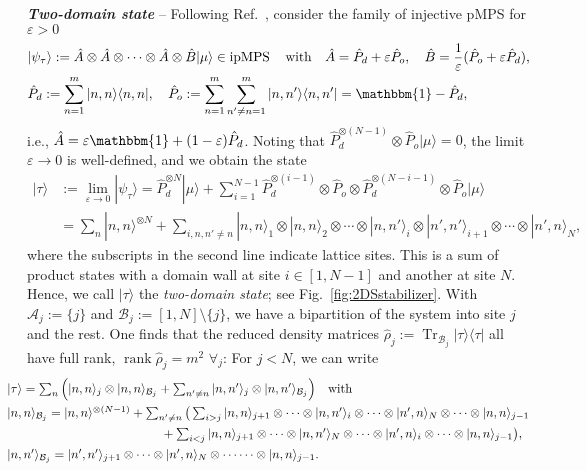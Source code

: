 \documentclass[english,11pt,aps,pra,onecolumn,tightenlines,groupedaddress,superscriptaddress,notitlepage,floatfix,fleqn]{revtex4-1}
\newcommand{\id}{\mathbbm{1}}
\newcommand{\bra}{\langle}
\newcommand{\ket}{\rangle}
\newcommand{\Tr}{\operatorname{Tr}}
\newcommand{\Rank}{\operatorname{rank}}
\newcommand{\hA}{\hat{A}}
\newcommand{\hB}{\hat{B}}
\newcommand{\hP}{\hat{P}}
\newcommand{\dm}{{\hat{\rho}}}
\newcommand{\mc}[1]{\mathcal{#1}}
\newcommand{\A}{\mc{A}}
\newcommand{\B}{\mc{B}}
\newcommand{\ipMPS}{\operatorname{ipMPS}}
\newcommand{\veps}{\varepsilon}
\newcommand{\Emph}[1]{\textbf{\emph{#1}}}
\begin{document}
\Emph{Two-domain state} -- Following Ref.~\cite{Landsberg2012-12}, consider the family of injective pMPS for $\veps>0$
\begin{subequations}\label{eq:psiTau}
\begin{align}
	&|\psi_\tau\ket:=\hat{A}\otimes\hat{A}\otimes\dotsb\otimes\hat{A}\otimes\hat{B}|\mu\ket\in\ipMPS\quad\text{with}\quad
	\hA=\hP_d+\veps\hP_o,\quad
	\hB=\frac{1}{\veps}(\hP_o+\veps\hP_d),\\
	&\hP_d:=\sum_{n=1}^m|n,n\ket\bra n,n|,\quad
	\hP_o:=\sum_{n=1}^m\sum_{n'\neq n=1}^m|n,n'\ket\bra n,n'|=\id-\hP_d,
\end{align}
\end{subequations}
i.e., $\hat{A}=\veps \id+(1-\veps)\hP_d$. Noting that $\hP_d^{\otimes (N-1)}\otimes\hP_o|\mu\ket=0$, the limit $\veps\to 0$ is well-defined, and we obtain the state
\begin{align}\nonumber
	|\tau\ket
	&:= \lim_{\veps\to 0}|\psi_\tau\ket
	=\hP_d^{\otimes N}|\mu\ket+\sum_{i=1}^{N-1}\hP_d^{\otimes (i-1)}\otimes\hP_o\otimes\hP_d^{\otimes (N-i-1)}\otimes \hP_o|\mu\ket\\
	\label{eq:2DS}
	&=\sum_n|n,n\ket^{\otimes N} + \!\!\sum_{i,n,n'\neq n}\!\!|n,n\ket_1\otimes|n,n\ket_2\otimes\dotsb\otimes|n,n'\ket_i\otimes |n',n'\ket_{i+1}\otimes\dotsb\otimes|n',n\ket_{N},
\end{align}
where the subscripts in the second line indicate lattice sites. This is a sum of product states with a domain wall at site $i\in[1,N-1]$ and another at site $N$. Hence, we call $|\tau\ket$ the \emph{two-domain state}; see Fig.~\ref{fig:2DSstabilizer}. With $\A_j:=\{j\}$ and $\B_j:=[1,N]\setminus\{j\}$, we have a bipartition of the system into site $j$ and the rest. One finds that the reduced density matrices $\dm_j:=\Tr_{\B_j}|\tau\ket\bra\tau|$ all have full rank, $\Rank\dm_j=m^2$ $\forall_j$: For $j<N$, we can write
\begin{align*}
	&\hspace{-4ex}\textstyle|\tau\ket=\sum_n\Big( |n,n\ket_j\otimes |n,n\ket_{\B_j}+\sum_{n'\neq n}|n,n'\ket_j\otimes|n,n'\ket_{\B_j}\Big)\quad\text{with}\\
	&\hspace{-4ex}\textstyle|n,n\ket_{\B_j}=|n,n\ket^{\otimes(N-1)}+\sum_{n'\neq n}\big(\sum_{i>j}|n,n\ket_{j+1}\otimes\dotsb\otimes |n,n'\ket_i\otimes\dotsb\otimes|n',n\ket_N\otimes\dotsb\otimes|n,n\ket_{j-1}\\
	&\hspace{-4ex}\textstyle\hspace{28.8ex} +\sum_{i<j}|n,n\ket_{j+1}\otimes\dotsb\otimes |n,n'\ket_N\otimes\dotsb\otimes|n',n\ket_i\otimes\dotsb\otimes|n,n\ket_{j-1}\big),\\
	&\hspace{-4ex}\textstyle|n,n'\ket_{\B_j}=|n',n'\ket_{j+1}\otimes\dotsb\otimes |n',n\ket_N\otimes\dotsb\dotsb\otimes|n,n\ket_{j-1}.
\end{align*}
\end{document}
